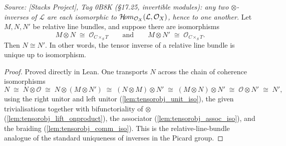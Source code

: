 \begin{lemma}\leanok
  \label{lem:rel_pic_sharp_inverse_unique}
  \textit{Source: [Stacks Project], Tag 0B8K (\S 17.25, invertible modules): any
  two \(\otimes\)-inverses of \(\mathcal{L}\) are each isomorphic to
  \(\mathcal{H}\!om_{\mathcal{O}_X}(\mathcal{L}, \mathcal{O}_X)\), hence to one
  another.}
  Let \(M, N, N'\) be relative line bundles, and suppose there are
  isomorphisms
  \[
    M \otimes N \;\cong\; \mathcal{O}_{C \times_S T}
    \qquad\text{and}\qquad
    M \otimes N' \;\cong\; \mathcal{O}_{C \times_S T}.
  \]
  Then \(N \cong N'\). In other words, the tensor inverse of a relative line
  bundle is unique up to isomorphism.
\end{lemma}

\begin{proof}
    \leanok
  Proved directly in Lean. One transports \(N\) across the chain of coherence
  isomorphisms
  \[
    N \;\cong\; N \otimes \mathcal{O}
      \;\cong\; N \otimes (M \otimes N')
      \;\cong\; (N \otimes M) \otimes N'
      \;\cong\; (M \otimes N) \otimes N'
      \;\cong\; \mathcal{O} \otimes N'
      \;\cong\; N',
  \]
  using the right unitor and left unitor (\cref{lem:tensorobj_unit_iso}), the
  given trivialisations together with bifunctoriality of \(\otimes\)
  (\cref{lem:tensorobj_lift_onproduct}), the associator
  (\cref{lem:tensorobj_assoc_iso}), and the braiding
  (\cref{lem:tensorobj_comm_iso}). This is the relative-line-bundle analogue of
  the standard uniqueness of inverses in the Picard group.
\end{proof}

